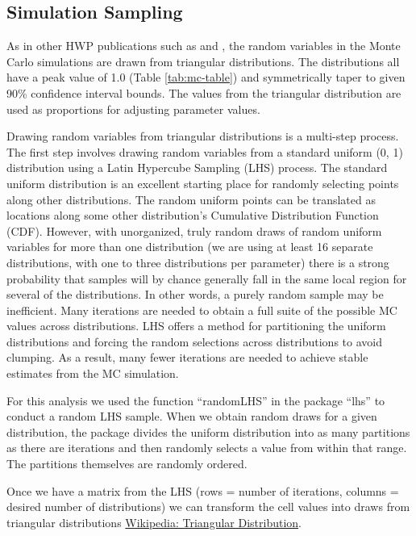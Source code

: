 \documentclass[
  openany]{book}
\begin{document}
\hypertarget{model-mc-samp}{%
\subsection{Simulation Sampling}\label{model-mc-samp}}

As in other HWP publications such as \textcite{stockmann2012} and \textcite{anderson2013}, the random variables in the Monte Carlo simulations are drawn from triangular distributions. The distributions all have a peak value of 1.0 (Table \ref{tab:mc-table}) and symmetrically taper to given 90\% confidence interval bounds. The values from the triangular distribution are used as proportions for adjusting parameter values.

Drawing random variables from triangular distributions is a multi-step process. The first step involves drawing random variables from a standard uniform (0, 1) distribution using a Latin Hypercube Sampling (LHS) process. The standard uniform distribution is an excellent starting place for randomly selecting points along other distributions. The random uniform points can be translated as locations along some other distribution's Cumulative Distribution Function (CDF). However, with unorganized, truly random draws of random uniform variables for more than one distribution (we are using at least 16 separate distributions, with one to three distributions per parameter) there is a strong probability that samples will by chance generally fall in the same local region for several of the distributions. In other words, a purely random sample may be inefficient. Many iterations are needed to obtain a full suite of the possible MC values across distributions. LHS offers a method for partitioning the uniform distributions and forcing the random selections across distributions to avoid clumping. As a result, many fewer iterations are needed to achieve stable estimates from the MC simulation.

For this analysis we used the function ``randomLHS'' in the package ``lhs'' \autocite{R-lhs} to conduct a random LHS sample. When we obtain random draws for a given distribution, the package divides the uniform distribution into as many partitions as there are iterations and then randomly selects a value from within that range. The partitions themselves are randomly ordered.

Once we have a matrix from the LHS (rows = number of iterations, columns = desired number of distributions) we can transform the cell values into draws from triangular distributions \href{https://en.wikipedia.org/wiki/Triangular_distribution}{Wikipedia: Triangular Distribution}.
\end{document}
